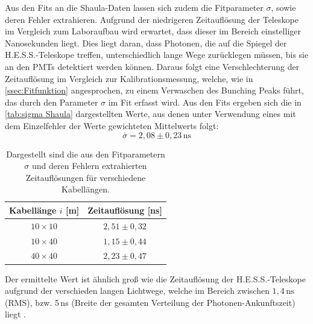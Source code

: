 Aus den Fits an die Shaula-Daten lassen sich zudem die Fitparameter $\sigma$, sowie deren Fehler extrahieren. 
Aufgrund der niedrigeren Zeitauflösung der Teleskope im Vergleich zum Laboraufbau wird erwartet, dass dieser im Bereich einstelliger Nanosekunden liegt. 
Dies liegt daran, dass Photonen, die auf die Spiegel der H.E.S.S.-Teleskope treffen, unterschiedlich lange Wege zurücklegen müssen, bis sie an den PMTs detektiert werden können. 
Daraus folgt eine Verschlechterung der Zeitauflösung im Vergleich zur Kalibrationsmessung, welche, wie in \autoref{ssec:Fitfunktion} angesprochen, zu einem Verwaschen des Bunching Peaks führt, das durch den Parameter $\sigma$ im Fit erfasst wird. 
Aus den Fits ergeben sich die in \autoref{tab:sigma Shaula} dargestellten Werte, aus denen unter Verwendung eines mit dem Einzelfehler der Werte gewichteten Mittelwerts folgt: 
\begin{equation}
    \overline{\sigma} = 2{,}08 \pm 0{,}23\,\mathrm{ns}
\end{equation}
\begin{table}[h]
    \centering
    \begin{tabular}{|c|c|}\hline
        Kabellänge $i$ [m] & Zeitauflösung [ns]  \\\hline
        $10\times 10$      & $2{,}51 \pm 0{,}32$ \\\hline
        $10\times 40$      & $1{,}15 \pm 0{,}44$ \\\hline
        $40\times 40$      & $2{,}23 \pm 0{,}47$ \\\hline
    \end{tabular}
    \caption{Dargestellt sind die aus den Fitparametern $\sigma$ und deren Fehlern extrahierten Zeitauflösungen für verschiedene Kabellängen.}
    \label{tab:sigma Shaula}
\end{table}
Der ermittelte Wert ist ähnlich groß wie die Zeitauflösung der H.E.S.S.-Teleskope aufgrund der verschieden langen Lichtwege, welche im Bereich zwischen $1{,}4\,\mathrm{ns}$ (RMS), bzw. 5\,ns (Breite der gesamten Verteilung der Photonen-Ankunftszeit) liegt \cite{bernlohrOpticalSystemImaging2003}. 
